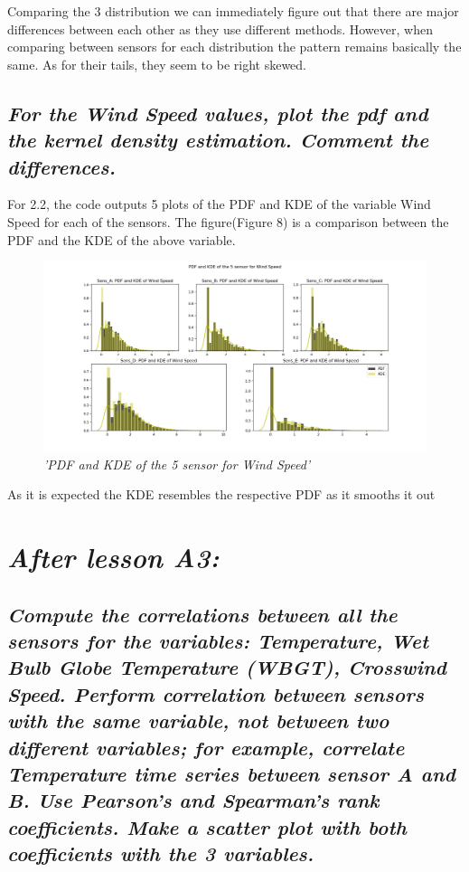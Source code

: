 \documentclass[a4paper,12pt]{article}
\begin{document}
Comparing the 3 distribution we can immediately figure out that there are major 
differences between each other as they use different methods. However, when comparing between sensors for each distribution the pattern remains basically the same. As for their tails, they seem to be right skewed.




\subsection{\it For the Wind Speed values, plot the pdf and the kernel density estimation. Comment the differences.}




For 2.2, the code outputs 5 plots of the PDF and KDE 
of the variable Wind Speed for each of the sensors. The figure(Figure 8) is a 
comparison between the PDF and the KDE of the above variable.



\begin{figure}[H]
\centering
\includegraphics[width=\textwidth]{Graphs/PDF_and_KDE_of_the_5_sensor_-_Wind_Speed.png}
\caption{\it'PDF and KDE of the 5 sensor for Wind Speed'}
\end{figure}




As it is expected the KDE resembles the respective PDF as it smooths it out 




\section{\it After lesson A3:}
\subsection{\it Compute the correlations between all the sensors for the variables: Temperature, Wet Bulb Globe Temperature (WBGT), Crosswind Speed. Perform correlation between sensors with the same variable, not between two different variables; for example, correlate Temperature time series between sensor A and B. Use Pearson’s and Spearman’s rank coefficients. Make a scatter plot with both coefficients with the 3 variables.}
\end{document}
